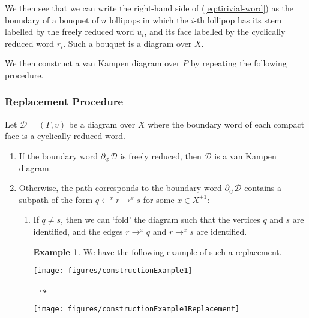 \documentclass[11pt,a4paper,reqno]{amsart}
\theoremstyle{plain}
\theoremstyle{definition}
\theoremstyle{definition}
\newtheorem{example}[theorem]{Example}
\begin{document}
We then see that we can write the right-hand side of (\ref{eq:tirivial-word}) as the boundary of a bouquet of $n$ lollipops in which the $i$-th lollipop has its stem labelled by the freely reduced word $u_i$, and its face labelled by the cyclically reduced word $r_i$.
Such a bouquet is a diagram over $X$.

We then construct a van Kampen diagram over $P$ by repeating the following procedure.

\subsubsection{Replacement Procedure}
Let $\mathcal D = (\Gamma, v)$ be a diagram over $X$ where the boundary word of each compact face is a cyclically reduced word.
\begin{enumerate}
	\item If the boundary word $\partial_{\circlearrowleft}\mathcal D$ is freely reduced, then $\mathcal D$ is a van Kampen diagram.
	\item Otherwise, the path corresponds to the boundary word $\partial_{\circlearrowleft}\mathcal D$ contains a subpath of the form $q \leftarrow^{x} r \to^x s$ for some $x\in X^{\pm 1}$:
	      \begin{enumerate}
		      \item If $q \neq s$, then we can `fold' the diagram such that the vertices $q$ and $s$ are identified, and the edges $r \to^x q$ and $r \to^x s$ are identified.

		            \smallskip

		            \begin{example}
			            We have the following example of such a replacement.

			            \smallskip

			            \begin{center}
				            \begin{minipage}{.4\linewidth}
					            \centering
					            \texttt{[image: figures/constructionExample1]}%
				            \end{minipage}
				            ~{\Large$\leadsto$}~
				            \begin{minipage}{.4\linewidth}
					            \centering
					            \texttt{[image: figures/constructionExample1Replacement]}%
				            \end{minipage}
			            \end{center}


\end{example}
\end{enumerate}
\end{enumerate}
\end{document}
